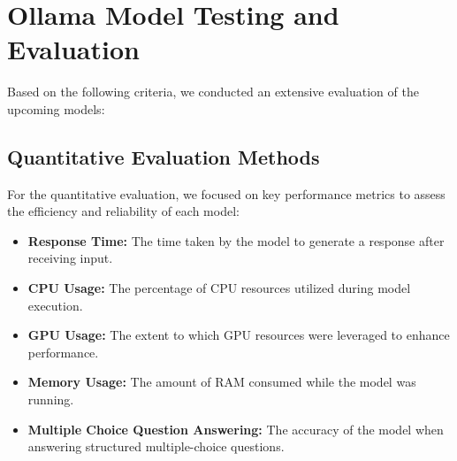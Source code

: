 




\section{Ollama Model Testing and Evaluation}

Based on the following criteria, we conducted an extensive evaluation of the upcoming models:

\subsection{Quantitative Evaluation Methods}

For the quantitative evaluation, we focused on key performance metrics to assess the efficiency and reliability of each model:

\begin{itemize}
    \item \textbf{Response Time:} The time taken by the model to generate a response after receiving input.
    \item \textbf{CPU Usage:} The percentage of CPU resources utilized during model execution.
    \item \textbf{GPU Usage:} The extent to which GPU resources were leveraged to enhance performance.
    \item \textbf{Memory Usage:} The amount of RAM consumed while the model was running.
    \item \textbf{Multiple Choice Question Answering:} The accuracy of the model when answering structured multiple-choice questions.
\end{itemize}

